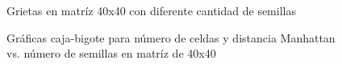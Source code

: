\documentclass{article}
\begin{document}
\begin{figure}[htbp]
\centering
{}
\caption{Grietas en matríz 40x40 con diferente cantidad de semillas} \label{figura 4}
\end{figure}


\begin{figure}[htbp]
\centering
{}
\caption{Gráficas caja-bigote para número de celdas y distancia Manhattan vs. número de semillas en matríz de 40x40} \label{figura 1}
\end{figure}
\end{document}

